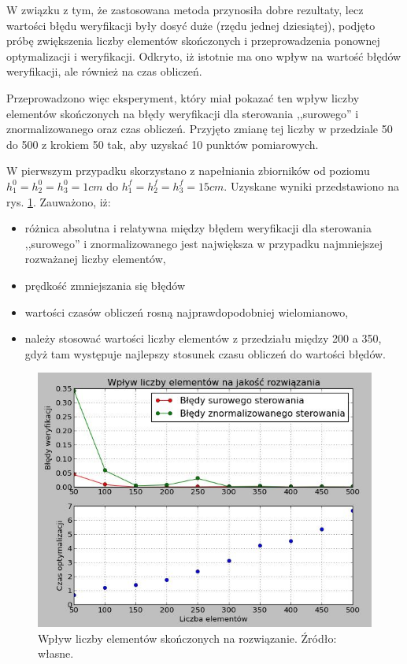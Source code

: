 W związku z tym, że zastosowana metoda przynosiła dobre rezultaty, lecz wartości błędu weryfikacji były dosyć duże (rzędu jednej dziesiątej), podjęto próbę zwiększenia liczby elementów skończonych i przeprowadzenia ponownej optymalizacji i weryfikacji. Odkryto, iż istotnie ma ono wpływ na wartość błędów weryfikacji, ale również na czas obliczeń.

Przeprowadzono więc eksperyment, który miał pokazać ten wpływ liczby elementów skończonych na błędy weryfikacji dla sterowania ,,surowego'' i znormalizowanego oraz czas obliczeń. Przyjęto zmianę tej liczby w przedziale 50 do 500 z krokiem 50 tak, aby uzyskać 10 punktów pomiarowych.

W pierwszym przypadku skorzystano z napełniania zbiorników od poziomu $h_{1}^{0} = h_{2}^{0} = h_{3}^{0} = 1 cm$ do $h_{1}^{f} = h_{2}^{f} = h_{3}^{f} = 15 cm$. Uzyskane wyniki przedstawiono na rys. \ref{fig:elementsinfluence1-15_50-500}. Zauważono, iż:
\begin{itemize}
    \item różnica absolutna i relatywna między błędem weryfikacji dla sterowania ,,surowego'' i znormalizowanego jest największa w przypadku najmniejszej rozważanej liczby elementów,
    \item prędkość zmniejszania się błędów
    \item wartości czasów obliczeń rosną najprawdopodobniej wielomianowo,
    \item należy stosować wartości liczby elementów z przedziału między 200 a 350, gdyż tam występuje najlepszy stosunek czasu obliczeń do wartości błędów.
\end{itemize}

\begin{figure}[ht]
    \centering
    \includegraphics{Grafika/elements_influence_1-15_50-500}
    \caption{Wpływ liczby elementów skończonych na rozwiązanie. Źródło: własne.}
    \label{fig:elementsinfluence1-15_50-500}
\end{figure}

